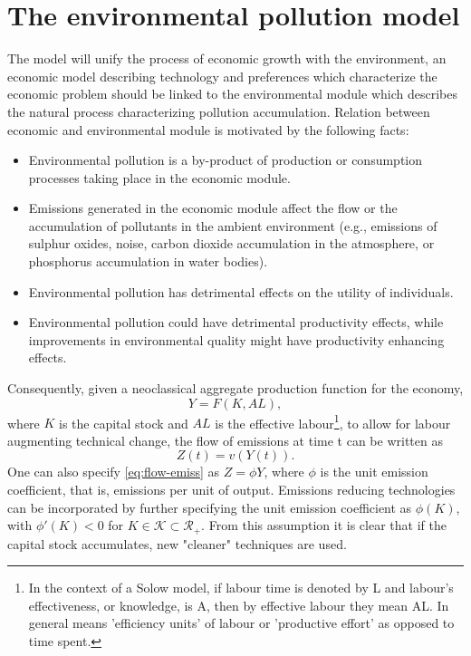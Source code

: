 \section{The environmental pollution model}\label{Sec:model}
The model will unify the process of economic growth with the environment, an economic model describing technology and preferences which characterize the economic problem should be linked to the environmental module which describes the natural process characterizing pollution accumulation. Relation between economic and environmental module is motivated by the following facts:
\begin{itemize}
	\item Environmental pollution is a by-product of production or consumption processes
	taking place in the economic module.
	\item Emissions generated in the economic module affect the flow or the accumulation
	of pollutants in the ambient environment (e.g., emissions of sulphur oxides, noise,
	carbon dioxide accumulation in the atmosphere, or phosphorus accumulation in
	water bodies).
	\item Environmental pollution has detrimental effects on the utility of individuals.
	\item Environmental pollution could have detrimental productivity effects, while improvements in environmental quality might have productivity enhancing effects.
\end{itemize}
Consequently, given a neoclassical aggregate production function for the economy, 
\begin{equation}\label{eq:prod-func}
	Y = F(K, AL), 
\end{equation} 
where $K$ is the capital stock and $AL$ is the effective labour\footnote{ In the context of a Solow model, if labour time is denoted by L and labour's effectiveness, or knowledge, is A, then by effective labour they mean AL. In general means 'efficiency units' of labour or 'productive effort' as opposed to time spent.}, to allow for labour augmenting technical change, the flow of emissions at time t can be written as
\begin{equation}\label{eq:flow-emiss}
	Z(t) = v(Y(t)). 
\end{equation}
One can also specify \eqref{eq:flow-emiss} as $Z=\phi Y$, where $\phi$ is the unit emission coefficient, that is, emissions per unit of output. Emissions reducing technologies can be incorporated by further specifying the unit emission coefficient as $\phi (K)$, with $\phi' (K)<0$ for $K\in \mathcal{K} \subset \mathcal{R_+}$. From this assumption it is clear that if the capital stock accumulates, new "cleaner" techniques are used. 
